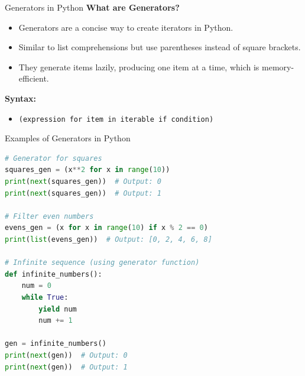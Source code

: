 \documentclass[10pt]{beamer}
\let\olditem\item
\renewcommand\item{\olditem\justifying}
\begin{document}
	\begin{frame}{Generators in Python}
		\textbf{What are Generators?}
		\begin{itemize}
			\item Generators are a concise way to create iterators in Python.
			\item Similar to list comprehensions but use parentheses instead of square brackets.
			\item They generate items lazily, producing one item at a time, which is memory-efficient.
		\end{itemize}
		
		\textbf{Syntax:}
		\begin{itemize}
			\item \texttt{(expression for item in iterable if condition)}
		\end{itemize}
		
	\end{frame}
	\begin{frame}[fragile]{Examples of Generators in Python}
		\begin{lstlisting}[language=Python, caption=Examples of Generators]
# Generator for squares
squares_gen = (x**2 for x in range(10))
print(next(squares_gen))  # Output: 0
print(next(squares_gen))  # Output: 1

# Filter even numbers
evens_gen = (x for x in range(10) if x % 2 == 0)
print(list(evens_gen))  # Output: [0, 2, 4, 6, 8]

# Infinite sequence (using generator function)
def infinite_numbers():
	num = 0
	while True:
		yield num
		num += 1

gen = infinite_numbers()
print(next(gen))  # Output: 0
print(next(gen))  # Output: 1
		\end{lstlisting}

	\end{frame}
	
\end{document}

